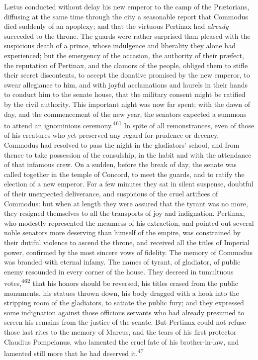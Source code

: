 
Lætus conducted without delay his new emperor to the camp of the
Prætorians, diffusing at the same time through the city a
seasonable report that Commodus died suddenly of an apoplexy; and
that the virtuous Pertinax had \textit{already} succeeded to the throne.
The guards were rather surprised than pleased with the suspicious
death of a prince, whose indulgence and liberality they alone had
experienced; but the emergency of the occasion, the authority of
their præfect, the reputation of Pertinax, and the clamors of the
people, obliged them to stifle their secret discontents, to
accept the donative promised by the new emperor, to swear
allegiance to him, and with joyful acclamations and laurels in
their hands to conduct him to the senate house, that the military
consent might be ratified by the civil authority. This important
night was now far spent; with the dawn of day, and the
commencement of the new year, the senators expected a summons to
attend an ignominious ceremony.\textsuperscript{461} In spite of all
remonstrances, even of those of his creatures who yet preserved
any regard for prudence or decency, Commodus had resolved to pass
the night in the gladiators’ school, and from thence to take
possession of the consulship, in the habit and with the
attendance of that infamous crew. On a sudden, before the break
of day, the senate was called together in the temple of Concord,
to meet the guards, and to ratify the election of a new emperor.
For a few minutes they sat in silent suspense, doubtful of their
unexpected deliverance, and suspicious of the cruel artifices of
Commodus: but when at length they were assured that the tyrant
was no more, they resigned themselves to all the transports of
joy and indignation. Pertinax, who modestly represented the
meanness of his extraction, and pointed out several noble
senators more deserving than himself of the empire, was
constrained by their dutiful violence to ascend the throne, and
received all the titles of Imperial power, confirmed by the most
sincere vows of fidelity. The memory of Commodus was branded with
eternal infamy. The names of tyrant, of gladiator, of public
enemy resounded in every corner of the house. They decreed in
tumultuous votes,\textsuperscript{462} that his honors should be reversed, his
titles erased from the public monuments, his statues thrown down,
his body dragged with a hook into the stripping room of the
gladiators, to satiate the public fury; and they expressed some
indignation against those officious servants who had already
presumed to screen his remains from the justice of the senate.
But Pertinax could not refuse those last rites to the memory of
Marcus, and the tears of his first protector Claudius Pompeianus,
who lamented the cruel fate of his brother-in-law, and lamented
still more that he had deserved it.\textsuperscript{47}

